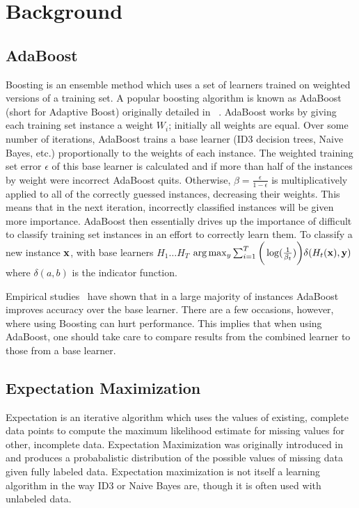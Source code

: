 \documentclass{sig-alternate}
\begin{document}
\section{Background}
\subsection{AdaBoost}
Boosting is an ensemble method which uses a set of learners trained on weighted versions of a training set. A popular boosting algorithm is known as AdaBoost (short for Adaptive Boost) originally detailed in ~\cite{Freund:1997:DGO:261540.261549}.  AdaBoost works by giving each training set instance a weight $W_{i}$; initially all weights are equal. Over some number of iterations, AdaBoost trains a base learner (ID3 decision trees, Naive Bayes, etc.) proportionally to the weights of each instance. The weighted training set error $\epsilon$ of this base learner is calculated and if more than half of the instances by weight were incorrect AdaBoost quits.  Otherwise, $\beta=\frac{\epsilon}{1-\epsilon}$ is multiplicatively applied to all of the correctly guessed instances, decreasing their weights. This means that in the next iteration, incorrectly classified instances will be given more importance.  AdaBoost then essentially drives up the importance of difficult to classify training set instances in an effort to correctly learn them. To classify a new instance $\bf{x}$, with base learners $H_{1} \dots H_{T}$  $\arg \max_{y} \sum_{i=1}^{T}\bigg(\log(\frac{1}{\beta_{t}})\bigg) \delta(H_{t}(\bf{x}),y)$ where $\delta(a,b)$ is the indicator function.

Empirical studies~\cite{dietterich1997machine} have shown that in a large majority of instances AdaBoost improves accuracy over the base learner. There are a few occasions, however, where using Boosting can hurt performance. This implies that when using AdaBoost, one should take care to compare results from the combined learner to those from a base learner.

\subsection{Expectation Maximization}
Expectation is an iterative algorithm which uses the values of existing, complete data points to compute the maximum likelihood estimate for missing values for other, incomplete data. Expectation Maximization was originally introduced in~\cite{Dempster77maximumlikelihood} and produces a probabalistic distribution of the possible values of missing data given fully labeled data. Expectation maximization is not itself a learning algorithm in the way ID3 or Naive Bayes are, though it is often used with unlabeled data.
\end{document}
